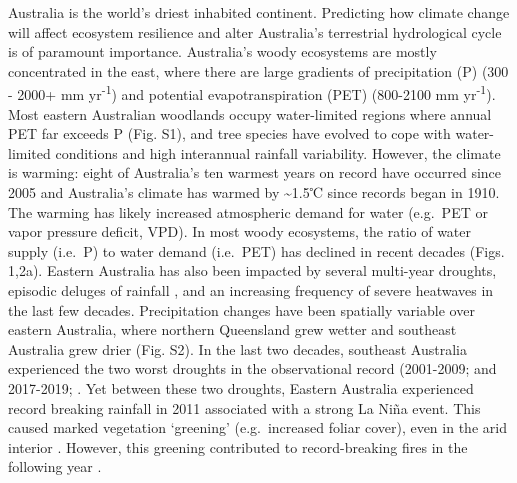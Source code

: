 \documentclass[gc, manuscript]{copernicus}
\begin{document}


\introduction[Introduction]

Australia is the world's driest inhabited continent. Predicting how
climate change will affect ecosystem resilience and alter Australia's
terrestrial hydrological cycle is of paramount importance. Australia's
woody ecosystems are mostly concentrated in the east, where there are
large gradients of precipitation (P) (300 - 2000+ mm
yr\textsuperscript{-1}) and potential evapotranspiration (PET) (800-2100
mm yr\textsuperscript{-1}). Most eastern Australian woodlands occupy
water-limited regions where annual PET far exceeds P (Fig. S1), and tree
species have evolved to cope with water-limited conditions
\citep{petersLivingEdgeContinentalscale2021} and high interannual
rainfall variability. However, the climate is warming: eight of
Australia's ten warmest years on record have occurred since 2005
\citep{csiroStateClimate20202020} and Australia's climate has warmed by
\textasciitilde1.5℃ since records began in 1910. The warming has likely
increased atmospheric demand for water (e.g.~PET or vapor pressure
deficit, VPD). In most woody ecosystems, the ratio of water supply
(i.e.~P) to water demand (i.e.~PET) has declined in recent decades
(Figs. 1,2a). Eastern Australia has also been impacted by several
multi-year droughts, episodic deluges of rainfall
\citep{kingRoleClimateVariability2020b}, and an increasing frequency of
severe heatwaves \citep{perkinsIncreasingFrequencyIntensity2012a} in the
last few decades. Precipitation changes have been spatially variable
over eastern Australia, where northern Queensland grew wetter and
southeast Australia grew drier (Fig. S2). In the last two decades,
southeast Australia experienced the two worst droughts in the
observational record (2001-2009;
\citet{vandijkMillenniumDroughtSoutheast2013d} and 2017-2019;
\citep{bureauofmeteorologyAnnualAustralianClimate}. Yet between these
two droughts, Eastern Australia experienced record breaking rainfall in
2011 associated with a strong La Niña event. This caused marked
vegetation `greening' (e.g.~increased foliar cover), even in the arid
interior
\citep{bastosGlobalNPPDependence2013a, poulterContributionSemiaridEcosystems2014, ahlstromDominantRoleSemiarid2015a}.
However, this greening contributed to record-breaking fires in the
following year \citep{harrisBiologicalResponsesPress2018b}.
\end{document}

